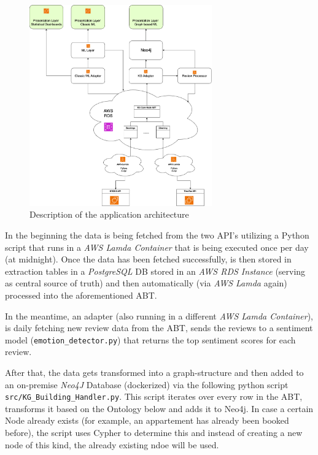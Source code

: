 \documentclass[
]{article}
\begin{document}
\begin{figure}[h]
  \centering
  \includegraphics[width=0.7\textwidth]{drawings/App_Architecture.png}
  \caption{Description of the application architecture}
\end{figure}

In the beginning the data is being fetched from the two API's utilizing
a Python script that runs in a \emph{AWS Lamda Container} that is being
executed once per day (at midnight). Once the data has been fetched
successfully, is then stored in extraction tables in a \emph{PostgreSQL}
DB stored in an \emph{AWS RDS Instance} (serving as central source of
truth) and then automatically (via \emph{AWS Lamda} again) processed
into the aforementioned ABT.

In the meantime, an adapter (also running in a different \emph{AWS Lamda
Container}), is daily fetching new review data from the ABT, sends the
reviews to a sentiment model (\texttt{emotion\_detector.py}) that
returns the top sentiment scores for each review.

After that, the data gets transformed into a graph-structure and then
added to an on-premise \emph{Neo4J} Database (dockerized) via the
following python script \texttt{src/KG\_Building\_Handler.py}. This
script iterates over every row in the ABT, transforms it based on the
Ontology below and adds it to Neo4j. In case a certain Node already
exists (for example, an appartement has already been booked before), the
script uses Cypher to determine this and instead of creating a new node
of this kind, the already existing ndoe will be used.
\end{document}
